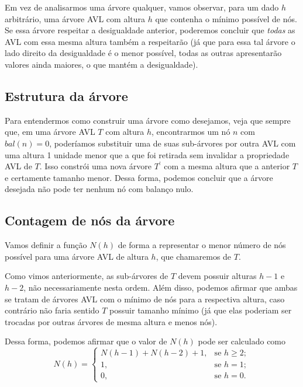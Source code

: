\documentclass[10pt,a4paper,twoside]{article}
\theoremstyle{definition}
\begin{document}
Em vez de analisarmos uma árvore qualquer, vamos observar, para um dado \( h \) arbitrário, uma árvore AVL com altura \( h \) que contenha o mínimo possível de nós. Se essa árvore respeitar a desigualdade anterior, poderemos concluir que \emph{todas} as AVL com essa mesma altura também a respeitarão (já que para essa tal árvore o lado direito da desigualdade é o menor possível, todas as outras apresentarão valores ainda maiores, o que mantém a desigualdade).

\subsection{Estrutura da árvore}
Para entendermos como construir uma árvore como desejamos, veja que sempre que, em uma árvore AVL \( T \) com altura \( h \), encontrarmos um nó \( n \) com \( bal(n) = 0 \), poderíamos substituir uma de suas sub-árvores por outra AVL com uma altura 1 unidade menor que a que foi retirada sem invalidar a propriedade AVL de \( T \). Isso constrói uma nova árvore \( T^\prime \) com a mesma altura que a anterior \( T \) e certamente tamanho menor. Dessa forma, podemos concluir que a árvore desejada não pode ter nenhum nó com balanço nulo.

\subsection{Contagem de nós da árvore}
Vamos definir a função \( N(h) \) de forma a representar o menor número de nós possível para uma árvore AVL de altura \( h \), que chamaremos de \( T \).

Como vimos anteriormente, as sub-árvores de \( T \) devem possuir alturas \( h-1 \) e \( h-2 \), não necessariamente nesta ordem. Além disso, podemos afirmar que ambas se tratam de árvores AVL com o mínimo de nós para a respectiva altura, caso contrário não faria sentido \( T \) possuir tamanho mínimo (já que elas poderiam ser trocadas por outras árvores de mesma altura e menos nós).

Dessa forma, podemos afirmar que o valor de \( N(h) \) pode ser calculado como \[ N(h) = \begin{cases}
    N(h-1) + N(h-2) + 1, & \text{se } h \geq 2; \\
    1                  , & \text{se } h = 1; \\
    0                  , & \text{se } h = 0.
\end{cases} \]
\end{document}
